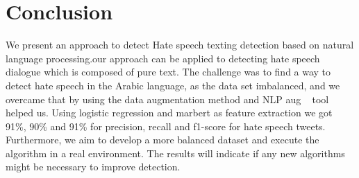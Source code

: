 \documentclass[10pt, a4paper, twoside, twocolumn]{article}
\begin{document}


\section{Conclusion}\label{sec:conclusion}
We present an approach to detect Hate speech texting detection based on natural language processing.our approach can be applied to detecting hate speech dialogue which is composed of pure text.
The challenge was to find a way to detect hate speech in the Arabic language, as the data set imbalanced, and we overcame that by using the data augmentation method and NLP aug ~\cite{al2020hate} tool helped us.
Using logistic regression and marbert as feature extraction we got 91\%, 90\% and 91\% for precision, recall and f1-score for hate speech tweets.
Furthermore, we aim to develop a more balanced dataset and execute the algorithm in a real environment. The results will indicate if any new algorithms might be necessary to improve
detection.



\clearpage

\onecolumn


\nocite{*}


\end{document}
